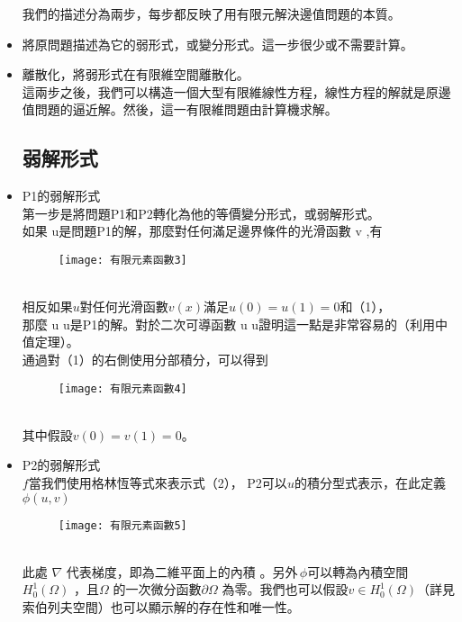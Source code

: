 \begin{itemize}
我們的描述分為兩步，每步都反映了用有限元解決邊值問題的本質。 \\
\item 將原問題描述為它的弱形式，或變分形式。這一步很少或不需要計算。\\
\item 離散化，將弱形式在有限維空間離散化。\\

這兩步之後，我們可以構造一個大型有限維線性方程，線性方程的解就是原邊值問題的逼近解。然後，這一有限維問題由計算機求解。 \\

\subsection{弱解形式}
\item P1的弱解形式\\
第一步是將問題P1和P2轉化為他的等價變分形式，或弱解形式。\\
如果 u是問題P1的解，那麼對任何滿足邊界條件的光滑函數 v ,有 \\
\begin{figure}[hbt!]
\begin{center}
\texttt{[image: 有限元素函數3]}
\end{center}
\end{figure}
\\
相反如果$ u$對任何光滑函數$ v(x)$滿足$ u(0)=u(1)=0$和（1），\\

那麼 u u是P1的解。對於二次可導函數 u u證明這一點是非常容易的（利用中值定理）。\\

通過對（1）的右側使用分部積分，可以得到 \\
\begin{figure}[hbt!]
\begin{center}
\texttt{[image: 有限元素函數4]}
\end{center}
\end{figure}
\\
其中假設$ v(0)=v(1)=0$。\\

\item P2的弱解形式\\

$ f$當我們使用格林恆等式來表示式（2）， P2可以$ u$的積分型式表示，在此定義$ {\displaystyle \phi (u,v)} $\\
\begin{figure}[hbt!]
\begin{center}
\texttt{[image: 有限元素函數5]}
\end{center}
\end{figure}
\\
此處 $ \nabla$ 代表梯度，即為二維平面上的內積 。另外$ {\displaystyle \,\!\phi }$可以轉為內積空間$ {\displaystyle H_{0}^{1}(\Omega )}$ ，且$ \Omega$ 的一次微分函數$ \partial \Omega$ 為零。我們也可以假設$ {\displaystyle v\in H_{0}^{1}(\Omega )}$（詳見索伯列夫空間）也可以顯示解的存在性和唯一性。\\ 


\end{itemize}
